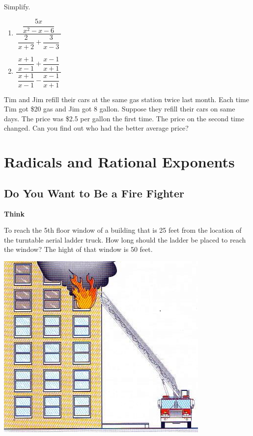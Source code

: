 \documentclass[en,12pt]{elegantbook}
\providecommand{\tightlist}{%
  \setlength{\itemsep}{0pt}\setlength{\parskip}{0pt}}
\newenvironment{rmdthink}{
	\par\noindent
	{
		\makebox[-\width][r]{
			\footnotesize
			\color{green!90}\faLightbulbO
			\hspace*{3pt}
		}
			\textbf{
				\color{second}
				Think 
			}
    }
    \begin{shaded}
    \sffamily
}{
    \par\medskip\ignorespacesafterend
    \end{shaded}
}
\providecommand{\tightlist}{%
  \setlength{\itemsep}{0pt}\setlength{\parskip}{0pt}}
\let\BeginKnitrBlock\begin \let\EndKnitrBlock\end
\begin{document}
\BeginKnitrBlock{exercise}
\protect\hypertarget{exr:unnamed-chunk-66}{}{\label{exr:unnamed-chunk-66} }
Simplify.

\begin{enumerate}
\def\labelenumi{\arabic{enumi}.}
\tightlist
\item
  \(\dfrac{~\dfrac{5x}{x^2-x-6}~}{~\dfrac2{x+2}+\dfrac{3}{x-3}~}\)
\item
  \(\dfrac{~\dfrac{x+1}{x-1}+\dfrac{x-1}{x+1}~}{~\dfrac{x+1}{x-1}-\dfrac{x-1}{x+1}~}\)
\end{enumerate}
\EndKnitrBlock{exercise}

\BeginKnitrBlock{exercise}
\protect\hypertarget{exr:unnamed-chunk-67}{}{\label{exr:unnamed-chunk-67} }
Tim and Jim refill their cars at the same gas station twice last month. Each time Tim got \$20 gas and Jim got 8 gallon. Suppose they refill their cars on same days. The price was \$2.5 per gallon the first time. The price on the second time changed. Can you find out who had the better average price?
\EndKnitrBlock{exercise}

\hypertarget{radicals-and-rational-exponents}{%
\chapter{Radicals and Rational Exponents}\label{radicals-and-rational-exponents}}

\hypertarget{do-you-want-to-be-a-fire-fighter}{%
\section{Do You Want to Be a Fire Fighter}\label{do-you-want-to-be-a-fire-fighter}}

\begin{rmdthink}

To reach the 5th floor window of a building that is 25 feet from the location of the turntable aerial ladder truck. How long should the ladder be placed to reach the window? The hight of that window is 50 feet.

\begin{center}\includegraphics[width=0.8\linewidth]{figs/Aerial-Apparatus-Positioning} \end{center}

\end{rmdthink}
\end{document}
